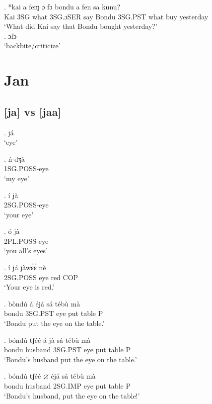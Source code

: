 \documentclass{assets/fieldnotes}
\begin{document}
\exg. *kai a feɱ ɔ fɔ bondu a fen sa kunu?\\
Kai 3SG what 3SG.ɔSER say Bondu 3SG.PST what buy yesterday\\
`What did Kai say that Bondu bought yesterday?' \\ 
 

\exg. ɔfɔ \\
`backbite/criticize' \\ 

\section{Jan}

\subsection{[ja] vs [jaa]}

\ex. já \\
`eye'

\exg. ń-dʒà \\
1SG.POSS-eye \\
`my eye'


\exg. í jà \\
2SG.POSS-eye \\
`your eye'

\exg. ó jà \\
2PL.POSS-eye \\
`you all's eyes'

\exg. í já jàwɛ̀ɛ̀ nè \\
2SG.POSS eye red COP \\
`Your eye is red.' 


\exg. bòndú á éjá sá tébù mà  \\
bondu 3SG.PST eye put table P \\
`Bondu put the eye on the table.' 

\exg. bóndú tʃéé á jà sá tébù mà \\
bondu husband 3SG.PST eye put table P \\
`Bondu's husband put the eye on the table.'

\exg. bóndú tʃéé $\varnothing$ éjá sá tébù mà \\
bondu husband 2SG.IMP eye put table P \\
`Bondu's husband, put the eye on the table!'
\end{document}
